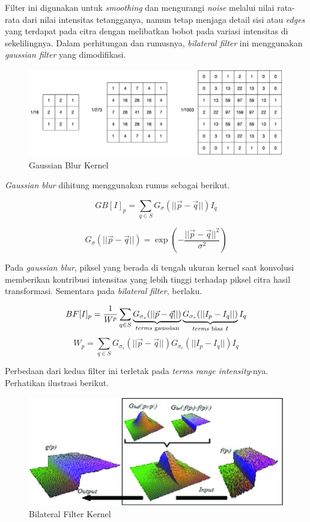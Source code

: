 \documentclass[11pt, a4paper, final]{report}
\begin{document}
Filter ini digunakan untuk \textit{smoothing} dan mengurangi \textit{noise} melalui nilai rata-rata dari nilai intensitas tetangganya, namun tetap menjaga detail sisi atau \textit{edges} yang terdapat pada citra dengan melibatkan bobot pada variasi intensitas di sekelilingnya. Dalam perhitungan dan rumusnya, \textit{bilateral filter} ini menggunakan \textit{gaussian filter} yang dimodifikasi.

\begin{figure}[H]
\centering
\includegraphics[scale=0.5]{assets/Gaussian.png}
\caption{Gaussian Blur Kernel \cite{gaussian}}
\end{figure}

\textit{Gaussian blur} dihitung menggunakan rumus sebagai berikut.

$$
GB[I]_p = \sum_{q \in S}{G_\sigma(||\vec{p} - \vec{q}||) I_q}
$$

$$
G_\sigma(||\vec{p} - \vec{q}||) = \exp(-{\frac{||\vec{p} - \vec{q}||^2}{\sigma^2}})
$$

Pada \textit{gaussian blur}, piksel yang berada di tengah ukuran kernel saat konvolusi memberikan kontribusi intensitas yang lebih tinggi terhadap piksel citra hasil transformasi. Sementara pada \textit{bilateral filter}, berlaku.

$$
BF[I]_p = \frac{1}{W^p} \sum_{q \in S}\underbrace{G_{\sigma_s}(||\vec{p}-\vec{q}||)}_{\text{\textit{terms} gaussian}}\underbrace{G_{\sigma_r}(||I_{p}-I_{q}||)}_{\text{\textit{terms} bias } I}I_q
$$
$$
W_p = \sum_{q\in S} G_{\sigma_s}(||\vec{p}-\vec{q}||)G_{\sigma_r}(||I_{p}-I_{q}||)I_q
$$

Perbedaan dari kedua filter ini terletak pada \textit{terms range intensity}-nya. Perhatikan ilustrasi berikut.

\begin{figure}[H]
\centering
\includegraphics[scale=0.35]{assets/bilateralKernel.png}
\caption{Bilateral Filter Kernel \cite{ali2017soft}}
\end{figure}
\end{document}

